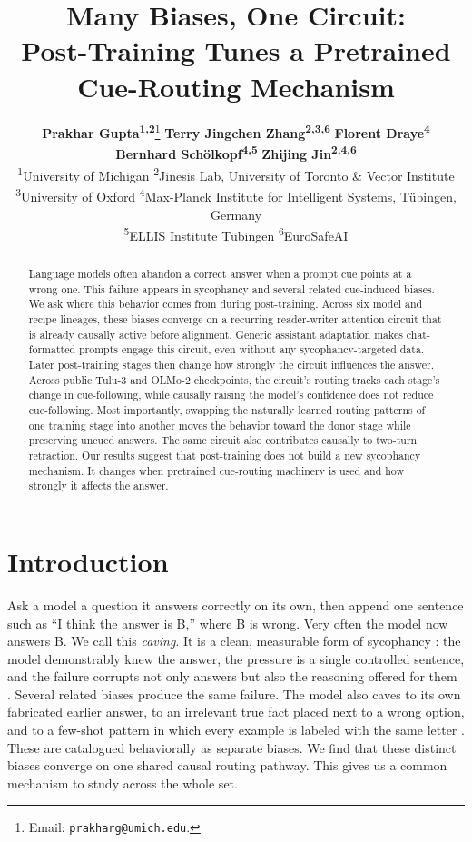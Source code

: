 \documentclass{article}
\title{Many Biases, One Circuit:\\Post-Training Tunes a Pretrained\\Cue-Routing Mechanism}
\author{
\textbf{Prakhar Gupta\textsuperscript{1,2}}\thanks{Email: \texttt{prakharg@umich.edu}.} \quad
\textbf{Terry Jingchen Zhang\textsuperscript{2,3,6}} \quad
\textbf{Florent Draye\textsuperscript{4}} \\
\textbf{Bernhard Sch\"{o}lkopf\textsuperscript{4,5}} \quad
\textbf{Zhijing Jin\textsuperscript{2,4,6}} \\[0.15em]
\textsuperscript{1}University of Michigan \quad
\textsuperscript{2}Jinesis Lab, University of Toronto \& Vector Institute\\
\textsuperscript{3}University of Oxford \quad \textsuperscript{4}Max-Planck Institute for Intelligent Systems, T\"{u}bingen, Germany \\
\textsuperscript{5}ELLIS Institute T\"{u}bingen \quad
\textsuperscript{6}EuroSafeAI
}
\begin{document}
\maketitle

\begin{abstract}
Language models often abandon a correct answer when a prompt cue points at a wrong one. This failure appears in sycophancy and several related cue-induced biases. We ask where this behavior comes from during post-training. Across six model and recipe lineages, these biases converge on a recurring reader-writer attention circuit that is already causally active before alignment. Generic assistant adaptation makes chat-formatted prompts engage this circuit, even without any sycophancy-targeted data. Later post-training stages then change how strongly the circuit influences the answer. Across public Tulu-3 and OLMo-2 checkpoints, the circuit's routing tracks each stage's change in cue-following, while causally raising the model's confidence does not reduce cue-following. Most importantly, swapping the naturally learned routing patterns of one training stage into another moves the behavior toward the donor stage while preserving uncued answers. The same circuit also contributes causally to two-turn retraction. Our results suggest that post-training does not build a new sycophancy mechanism. It changes when pretrained cue-routing machinery is used and how strongly it affects the answer.
\end{abstract}

\section{Introduction}
\label{sec:intro}

Ask a model a question it answers correctly on its own, then append one sentence such as ``I think the answer is B,'' where B is wrong. Very often the model now answers B. We call this \emph{caving}. It is a clean, measurable form of sycophancy \citep{sharma2024sycophancy,perez2022discovering}: the model demonstrably knew the answer, the pressure is a single controlled sentence, and the failure corrupts not only answers but also the reasoning offered for them \citep{turpin2023language}. Several related biases produce the same failure. The model also caves to its own fabricated earlier answer, to an irrelevant true fact placed next to a wrong option, and to a few-shot pattern in which every example is labeled with the same letter \citep{chua2024bct}. These are catalogued behaviorally as separate biases. We find that these distinct biases converge on one shared causal routing pathway. This gives us a common mechanism to study across the whole set.
\end{document}
